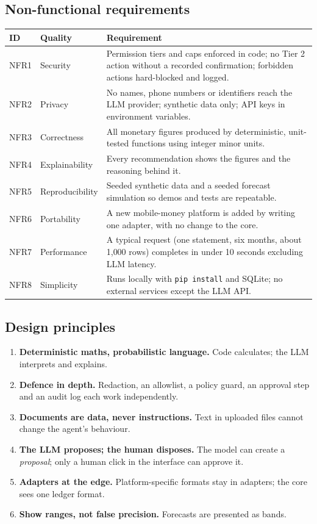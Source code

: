 \documentclass[10pt,a4paper]{article}
\newcommand{\code}[1]{\texttt{\small #1}}
\begin{document}
\subsection{Non-functional requirements}
\begin{longtable}{@{}p{1.3cm}p{3.3cm}p{10.5cm}@{}}
\toprule
\textbf{ID} & \textbf{Quality} & \textbf{Requirement}\\
\midrule\endhead
NFR1 & Security & Permission tiers and caps enforced in code; no Tier 2 action without a recorded confirmation; forbidden actions hard-blocked and logged.\\
NFR2 & Privacy & No names, phone numbers or identifiers reach the LLM provider; synthetic data only; API keys in environment variables.\\
NFR3 & Correctness & All monetary figures produced by deterministic, unit-tested functions using integer minor units.\\
NFR4 & Explainability & Every recommendation shows the figures and the reasoning behind it.\\
NFR5 & Reproducibility & Seeded synthetic data and a seeded forecast simulation so demos and tests are repeatable.\\
NFR6 & Portability & A new mobile-money platform is added by writing one adapter, with no change to the core.\\
NFR7 & Performance & A typical request (one statement, six months, about 1{,}000 rows) completes in under 10 seconds excluding LLM latency.\\
NFR8 & Simplicity & Runs locally with \code{pip install} and SQLite; no external services except the LLM API.\\
\bottomrule
\end{longtable}

\subsection{Design principles}
\begin{enumerate}[label=\textbf{P\arabic*.}]
  \item \textbf{Deterministic maths, probabilistic language.} Code calculates; the LLM interprets and explains.
  \item \textbf{Defence in depth.} Redaction, an allowlist, a policy guard, an approval step and an audit log each work independently.
  \item \textbf{Documents are data, never instructions.} Text in uploaded files cannot change the agent's behaviour.
  \item \textbf{The LLM proposes; the human disposes.} The model can create a \emph{proposal}; only a human click in the interface can approve it.
  \item \textbf{Adapters at the edge.} Platform-specific formats stay in adapters; the core sees one ledger format.
  \item \textbf{Show ranges, not false precision.} Forecasts are presented as bands.
\end{enumerate}
\end{document}
